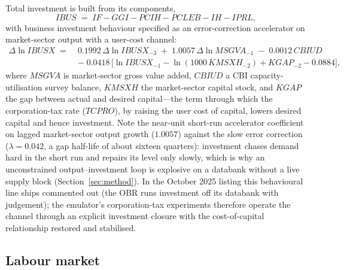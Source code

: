 Total investment is built from its components,
\begin{equation}
IBUS \;=\; IF - GGI - PCIH - PCLEB - IH - IPRL,
\end{equation}
with business investment behaviour specified as an error-correction accelerator on market-sector output with a user-cost channel:
\begin{equation}
\begin{aligned}
\Delta \ln IBUSX \;=\;& 0.1992\,\Delta \ln IBUSX_{-3} \;+\; 1.0057\,\Delta \ln MSGVA_{-1} \;-\; 0.0012\,CBIUD \\
&-\; 0.0418\,\big[\ln IBUSX_{-1} - \ln (1000\,KMSXH_{-2}) + KGAP_{-2} - 0.0884\big],
\end{aligned}
\label{eq:ibus}
\end{equation}
where $MSGVA$ is market-sector gross value added, $CBIUD$ a CBI capacity-utilisation survey balance, $KMSXH$ the market-sector capital stock, and $KGAP$ the gap between actual and desired capital---the term through which the corporation-tax rate ($TCPRO$), by raising the user cost of capital, lowers desired capital and hence investment. Note the near-unit short-run accelerator coefficient on lagged market-sector output growth ($1.0057$) against the slow error correction ($\lambda = 0.042$, a gap half-life of about sixteen quarters): investment chases demand hard in the short run and repairs its level only slowly, which is why an unconstrained output--investment loop is explosive on a databank without a live supply block (Section~\ref{sec:method}). In the October 2025 listing this behavioural line ships commented out (the OBR runs investment off its databank with judgement); the emulator's corporation-tax experiments therefore operate the channel through an explicit investment closure with the cost-of-capital relationship restored and stabilised.

\subsection{Labour market}
\label{sec:labour}

